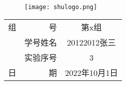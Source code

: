 
~

\vspace{10mm}


\begin{figure}[!htbp]
    \centering
    \texttt{[image: shulogo.png]}
\end{figure}


\centerline{}

\vspace{8mm}

\centerline{}

\vspace{8mm}


\vspace{8mm}

\begin{table}[!htbp]\large
    \centering
    \begin{tabular}{r c}
        组~~~~~~~~号    & 第x组\\                   \cmidrule(l){2-2} 
        学号姓名         & 20122012张三\\           \cmidrule(l){2-2} 
        实验序号         & 3\\                      \cmidrule(l){2-2} 
        日~~~~~~~~期    & 2022年10月1日\\           \cmidrule(l){2-2} 
    \end{tabular}
\end{table}

\vspace{8mm}

